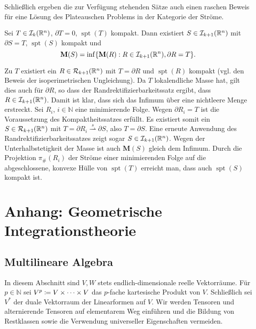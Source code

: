 \documentclass[a4paper,twoside,DIV15,BCOR12mm]{scrbook}
\newcommand{\MN}{\mathbf M}
\DeclareMathOperator{\spt}{spt}
\begin{document}
Schließlich ergeben die zur Verfügung stehenden Sätze auch einen 
raschen Beweis für eine Lösung des Plateauschen Problems in der Kategorie 
der Ströme. 

\begin{satz}
Sei $T\in\mathcal I_k(\mathbb{R}^n)$, $\partial T=0$, $\spt(T)$ kompakt. Dann existiert 
$S\in \mathcal I_{k+1}(\mathbb{R}^n)$ mit $\partial S=T$, $\spt(S)$ kompakt und
\[
\MN(S)=\inf\{\MN(R):R\in\mathcal{I}_{k+1}(\MdR^n),\partial R=T\}.
\]
\end{satz} 

\begin{beweis}
Zu $T$ existiert ein $R\in \mathcal R_{k+1}(\mathbb{R}^n)$ mit $T=\partial R$ und $\spt(R)$ kompakt 
(vgl. den Beweis der isoperimetrischen Ungleichung). Da $T$ lokalendliche Masse hat, 
gilt dies auch für $\partial R$, so dass der Randrektifizierbarkeitssatz ergibt, dass 
$R\in \mathcal I_{k+1}(\mathbb{R}^n)$. Damit ist klar, dass sich das Infimum über eine nichtleere Menge 
erstreckt. Sei $R_i$, $i\in\mathbb{N}$ eine minimierende Folge. Wegen $\partial R_i=T$ 
ist die Voraussetzung des Kompaktheitssatzes erfüllt. Es existiert somit ein 
$S\in \mathcal R_{k+1}(\mathbb{R}^n)$ mit $T=\partial R_i\stackrel s \rightharpoonup \partial S$, also $T=\partial S$. 
Eine erneute Anwendung des Randrektifizierbarkeitssatzes zeigt sogar $S\in \mathcal I_{k+1}(\mathbb{R}^n)$. 
Wegen der Unterhalbstetigkeit der Masse ist auch $\MN(S)$ gleich dem Infimum. Durch die Projektion $\pi_\#(R_i)$
der Ströme einer minimierenden Folge auf die abgeschlossene, konvexe Hülle von $\spt(T)$ 
erreicht man, dass auch $\spt(S)$ kompakt ist.
\end{beweis}




\chapter{Anhang: Geometrische Integrationstheorie}

\section{Multilineare Algebra}

In diesem Abschnitt sind $V, W$ stets endlich-dimensionale reelle Vektorräume. Für $p 
\in {\mathbb N}$ sei $V^{p} \da  V \times \dots \times V$ das $p$-fache 
kartesische Produkt von $V$. Schließlich sei $V^{*}$ der duale 
Vektorraum der Linearformen auf $V$. Wir werden Tensoren und 
alternierende Tensoren auf elementarem Weg einführen und die Bildung 
von Restklassen sowie die Verwendung universeller Eigenschaften 
vermeiden. 
\end{document}
